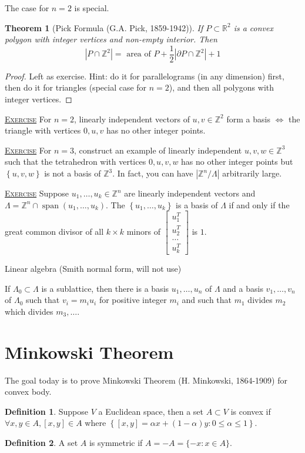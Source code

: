 \documentclass{report}
\newcommand{\R}{\mathbb{R}}
\newcommand{\Z}{\mathbb{Z}}
\newcommand{\set}[1]{\left\{ #1 \right\}}
\newcommand{\fancyem}[1]{\underline{\textsc{#1}}}
\newtheorem{theorem}{Theorem}[section]
\theoremstyle{definition}
\newtheorem{definition}{Definition}[section]
\theoremstyle{remark}
\numberwithin{equation}{section}
\begin{document}
The case for $n = 2$ is special. 
\begin{theorem}[Pick Formula (G.A. Pick, 1859-1942)]
    If $P \subset \R^2$ is a convex polygon with integer vertices and non-empty interior. Then \[
    |P \cap \Z^2| = \text{ area of } P + \frac{1}{2}|\partial P \cap \Z^2| + 1
    \]
\end{theorem}
\begin{proof}
    Left as exercise. Hint: do it for parallelograms (in any dimension) first, then do it for triangles (special case for $n = 2$), and then all polygons with integer vertices.
\end{proof}

\fancyem{Exercise} For $n = 2$, linearly independent vectors of $u, v \in \Z^2$ form a basis $\iff$ the triangle with vertices $0, u, v$ has no other integer points.

\fancyem{Exercise} For $n = 3$, construct an example of linearly independent $u, v, w \in \Z^3$ such that the tetrahedron  with vertices $0, u, v, w$ has no other integer points but $\set{u, v, w}$ is not a basis of $\Z^3$. In fact, you can have $|\Z^n/\Lambda|$ arbitrarily large.

\fancyem{Exercise} Suppose $u_1, \ldots, u_k \in \Z^n$ are linearly independent vectors and $\Lambda = \Z^n \cap \operatorname{span}(u_1, \ldots, u_k)$. The $\set{u_1, \ldots, u_k}$ is a basis of $\Lambda$ if and only if the great common divisor of all $k \times k$ minors of $\begin{bmatrix}
    u_1^T \\
    u_2^T \\
    \ldots \\
    u_k^T
\end{bmatrix}$ is $1$.

Linear algebra (Smith normal form, will not use)

If $\Lambda_0 \subset \Lambda$ is a sublattice, then there is a basis $u_1, \ldots, u_n$ of $\Lambda$ and a basis $v_1, \ldots, v_n$ of $\Lambda_0$ such that $v_i = m_iu_i$ for positive integer $m_i$ and such that $m_1$ divides $m_2$ which divides $m_3, \ldots$.

\section{Minkowski Theorem}
The goal today is to prove Minkowski Theorem (H. Minkowski, 1864-1909) for convex body.

\begin{definition}
    Suppose $V$ a Euclidean space, then a set $A \subset V$ is convex if $\forall x, y \in A, [x, y] \in A$ where $\set{[x, y] = \alpha x + (1-\alpha)y: 0 \leq \alpha \leq 1}$.
\end{definition}
\begin{definition}
    A set $A$ is symmetric if $A = -A = \{-x: x \in A\}$.
\end{definition}
\end{document}
